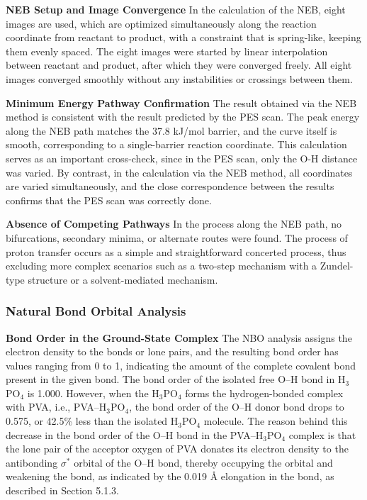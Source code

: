 \documentclass[12pt,a4paper]{report}
\begin{document}
\textbf{NEB Setup and Image Convergence}
In the calculation of the NEB, eight images are used, which are optimized simultaneously along the reaction coordinate from reactant to product, with a constraint that is spring-like, keeping them evenly spaced.\cite{89,90,91} The eight images were started by linear interpolation between reactant and product, after which they were converged freely. All eight images converged smoothly without any instabilities or crossings between them.

\textbf{Minimum Energy Pathway Confirmation}
The result obtained via the NEB method is consistent with the result predicted by the PES scan. The peak energy along the NEB path matches the 37.8 kJ/mol barrier, and the curve itself is smooth, corresponding to a single-barrier reaction coordinate. This calculation serves as an important cross-check, since in the PES scan, only the O-H distance was varied. By contrast, in the calculation via the NEB method, all coordinates are varied simultaneously, and the close correspondence between the results confirms that the PES scan was correctly done. \cite{89,90,91}

\textbf{Absence of Competing Pathways}
In the process along the NEB path, no bifurcations, secondary minima, or alternate routes were found. The process of proton transfer occurs as a simple and straightforward concerted process, thus excluding more complex scenarios such as a two-step mechanism with a Zundel-type structure or a solvent-mediated mechanism.\cite{61,62}

\subsubsection{Natural Bond Orbital Analysis}

\textbf{Bond Order in the Ground-State Complex}
The NBO analysis assigns the electron density to the bonds or lone pairs, and the resulting bond order has values ranging from 0 to 1, indicating the amount of the complete covalent bond present in the given bond.\cite{84,85} The bond order of the isolated free O–H bond in H\(_3\)PO\(_4\) is 1.000. However, when the H\(_3\)PO\(_4\) forms the hydrogen-bonded complex with PVA, i.e., PVA–H\(_3\)PO\(_4\), the bond order of the O–H donor bond drops to 0.575, or 42.5\% less than the isolated H\(_3\)PO\(_4\) molecule. The reason behind this decrease in the bond order of the O–H bond in the PVA–H\(_3\)PO\(_4\) complex is that the lone pair of the acceptor oxygen of PVA donates its electron density to the antibonding \(\sigma^*\) orbital of the O–H bond, thereby occupying the orbital and weakening the bond, as indicated by the 0.019 Å elongation in the bond, as described in Section 5.1.3. \cite{84, 85, 99}
\end{document}

